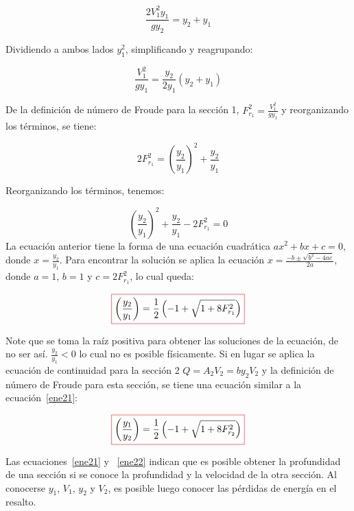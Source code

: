 \documentclass[11pt, oneside]{article}
\begin{document}
$$
\frac{2 V_1^2 y_1}{g y_2} = y_2 + y_1
$$

Dividiendo a ambos lados $y_1^2$, simplificando y reagrupando:

$$
\frac{V_1^2}{g y_1} = \frac{y_2}{2 y_1}\left( y_2 + y_1 \right)
$$

De la definici\'on de n\'umero de Froude para la secci\'on 1, $F_{r_1}^2 =\frac{V_1^2}{g y_1}$ y reorganizando los t\'erminos, se tiene:

$$
2 F_{r_1}^2 = \left( \frac{y_2}{y_1} \right)^2 + \frac{y_2}{y_1}
$$

Reorganizando los t\'erminos, tenemos:

$$
\left( \frac{y_2}{y_1} \right)^2 + \frac{y_2}{y_1} - 2 F_{r_1}^2 =0
$$
La ecuaci\'on anterior tiene la forma de una ecuaci\'on cuadr\'atica $ax^2 + bx + c =0 $, donde $x= \frac{y_2}{y_1}$. Para encontrar la soluci\'on se aplica la ecuaci\'on $x = \frac{-b \pm \sqrt{b^2-4ac}}{2a}$, donde $a=1$, $b=1$ y $c=2F_{r_1}^2$, lo cual queda:

\begin{equation}
\color{red}\boxed{\color{black} \left( \frac{y_2}{y_1} \right) = \frac{1}{2} \left( -1 + \sqrt{1 + 8 F_{r_1}^2} \right)}
\label{ene21}
\end{equation}

Note que se toma la raíz positiva para obtener las soluciones de la ecuaci\'on, de no ser as\'i. $\frac{y_2}{y_1} < 0$ lo cual no es posible f\'isicamente. Si en lugar se aplica la ecuaci\'on de continuidad para la secci\'on 2 $Q=A_2 V_2 = by_2 V_2$ y la definici\'on de n\'umero de Froude para esta secci\'on, se tiene una ecuaci\'on similar a la ecuaci\'on~\ref{ene21}:

\begin{equation}
\color{red}\boxed{\color{black} \left( \frac{y_1}{y_2} \right) = \frac{1}{2} \left( -1 + \sqrt{1 + 8 F_{r_2}^2} \right)}
\label{ene22}
\end{equation}

Las ecuaciones~\ref{ene21} y ~\ref{ene22} indican que es posible obtener la profundidad de una secci\'on si se conoce la profundidad y la velocidad de la otra secci\'on. Al conocerse $y_1$, $V_1$, $y_2$ y $V_2$, es posible luego conocer las p\'erdidas de energ\'ia en el resalto.
\end{document}
